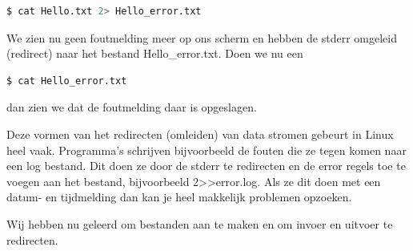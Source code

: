 \begin{lstlisting}[language=bash]
$ cat Hello.txt 2> Hello_error.txt
\end{lstlisting}

We zien nu geen foutmelding meer op ons scherm en hebben de stderr omgeleid (redirect) naar het bestand Hello\_error.txt. Doen we nu een
\begin{lstlisting}[language=bash]
$ cat Hello_error.txt
\end{lstlisting}
dan zien we dat de foutmelding daar is opgeslagen.

Deze vormen van het redirecten (omleiden) van data stromen gebeurt in Linux heel vaak. Programma's schrijven bijvoorbeeld de fouten die ze tegen komen naar een log bestand. Dit doen ze door de stderr te redirecten en de error regels toe te voegen aan het bestand, bijvoorbeeld 2>>error.log. Als ze dit doen met een datum- en tijdmelding dan kan je heel makkelijk problemen opzoeken.

Wij hebben nu geleerd om bestanden aan te maken en om invoer en uitvoer te redirecten.

